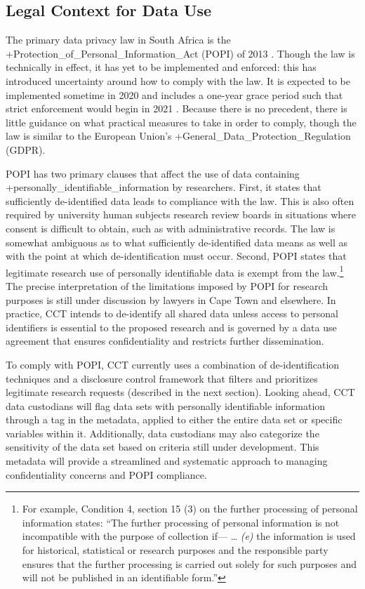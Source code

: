 \documentclass[
]{book}
\begin{document}
\hypertarget{legal-context-for-data-use-6}{%
\subsection{Legal Context for Data Use}\label{legal-context-for-data-use-6}}

The primary data privacy law in South Africa is the +Protection\_of\_Personal\_Information\_Act\textbar{} (POPI) of 2013 \citep{republicofsouthafrica2013}. Though the law is technically in effect, it has yet to be implemented and enforced: this has introduced uncertainty around how to comply with the law. It is expected to be implemented sometime in 2020 and includes a one-year grace period such that strict enforcement would begin in 2021 \citep{giles2020}. Because there is no precedent, there is little guidance on what practical measures to take in order to comply, though the law is similar to the European Union's +General\_Data\_Protection\_Regulation\textbar{} (GDPR).

POPI has two primary clauses that affect the use of data containing +personally\_identifiable\_information\textbar{} by researchers. First, it states that sufficiently de-identified data leads to compliance with the law. This is also often required by university human subjects research review boards in situations where consent is difficult to obtain, such as with administrative records. The law is somewhat ambiguous as to what sufficiently de-identified data means as well as with the point at which de-identification must occur. Second, POPI states that legitimate research use of personally identifiable data is exempt from the law.\footnote{For example, Condition 4, section 15 (3) on the further processing of personal information states: ``The further processing of personal information is not incompatible with the purpose of collection if--- \ldots{} \emph{(e)} the information is used for historical, statistical or research purposes and the responsible party ensures that the further processing is carried out solely for such purposes and will not be published in an identifiable form.''} The precise interpretation of the limitations imposed by POPI for research purposes is still under discussion by lawyers in Cape Town and elsewhere. In practice, CCT intends to de-identify all shared data unless access to personal identifiers is essential to the proposed research and is governed by a data use agreement that ensures confidentiality and restricts further dissemination.

To comply with POPI, CCT currently uses a combination of de-identification techniques and a disclosure control framework that filters and prioritizes legitimate research requests (described in the next section). Looking ahead, CCT data custodians will flag data sets with personally identifiable information through a tag in the metadata, applied to either the entire data set or specific variables within it. Additionally, data custodians may also categorize the sensitivity of the data set based on criteria still under development. This metadata will provide a streamlined and systematic approach to managing confidentiality concerns and POPI compliance.
\end{document}
